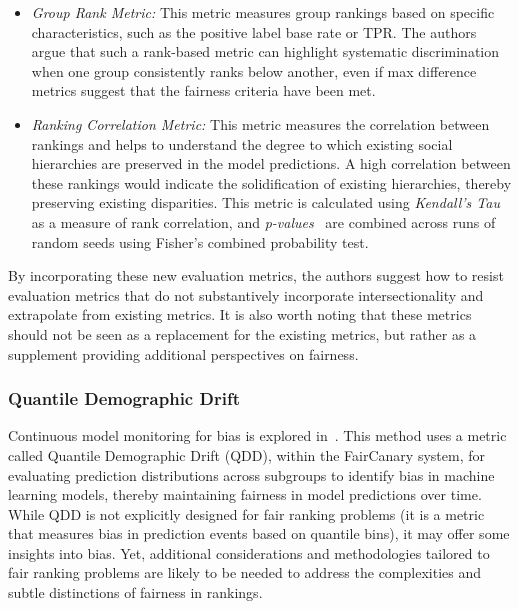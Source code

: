 \begin{itemize}
  \item \emph{Group Rank Metric:} This metric measures group rankings based on specific characteristics, such as the positive label base rate or TPR. The authors argue that such a rank-based metric can highlight systematic discrimination when one group consistently ranks below another, even if max difference metrics suggest that the fairness criteria have been met.
  
  \item \emph{Ranking Correlation Metric:} This metric measures the correlation between rankings and helps to understand the degree to which existing social hierarchies are preserved in the model predictions. A high correlation between these rankings would indicate the solidification of existing hierarchies, thereby preserving existing disparities. This metric is calculated using \emph{Kendall's Tau}~\cite{kendall1938new} as a measure of rank correlation, and \emph{p-values}~\cite{fisher1925statistical} are combined across runs of random seeds using Fisher's combined probability test.
\end{itemize}

By incorporating these new evaluation metrics, the authors suggest how to resist evaluation metrics that do not substantively incorporate intersectionality and extrapolate from existing metrics. It is also worth noting that these metrics should not be seen as a replacement for the existing metrics, but rather as a supplement providing additional perspectives on fairness.

\subsubsection{Quantile Demographic Drift}
\label{subsec:intrank_meth_metr_19n}

Continuous model monitoring for bias is explored in~\cite{ghosh2022faircanary}. This method uses a metric called Quantile Demographic Drift (QDD), within the FairCanary system, for evaluating prediction distributions across subgroups to identify bias in machine learning models, thereby maintaining fairness in model predictions over time.
While QDD is not explicitly designed for fair ranking problems (it is a metric that measures bias in prediction events based on quantile bins), it may offer some insights into bias. Yet, additional considerations and methodologies tailored to fair ranking problems are likely to be needed to address the complexities and subtle distinctions of fairness in rankings.


